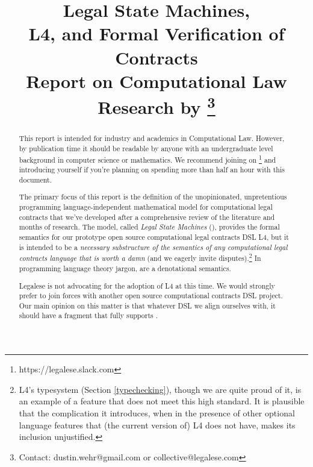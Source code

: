 \documentclass[12pt]{article}
\title{Legal State Machines, \\
L4, and Formal Verification of Contracts \\
\smaller \smaller Report on Computational Law Research by \extlink{https://legalese.com}{Legalese}\footnote{Contact: dustin.wehr@gmail.com or collective@legalese.com}\larger \larger }
\newcommand{\termz}[2]{\EM{\textsf{\hyperref[#1]{#2}}}\xspace}
\newcommand{\lsms}{\termz{LSM}{LSMs}}
\begin{document}
\maketitle

\begin{abstract}
This report is intended for industry and academics in Computational Law. However, by publication time it should be readable by anyone with an undergraduate level background in computer science or mathematics. We recommend joining  on \footnote{https://legalese.slack.com} and introducing yourself if you're planning on spending more than half an hour with this document. %

The primary focus of this report is the definition of the unopinionated, unpretentious programming language-independent mathematical model for computational legal contracts that we've developed after a comprehensive review of the literature and months of research. The model, called \textit{Legal State Machines} (\lsms), provides the formal semantics for our prototype open source computational legal contracts DSL L4, but it is intended to be a \textit{necessary substructure of the semantics of any computational legal contracts language that is worth a damn} (and we eagerly invite disputes).\footnote{L4's typesystem (Section \ref{typechecking}), though we are quite proud of it, is an example of a feature that does not meet this high standard. It is plausible that the complication it introduces, when in the presence of other optional language features that (the current version of) L4 does not have, makes its inclusion unjustified.}
In programming language theory jargon, \lsms are a denotational semantics.

Legalese is not advocating for the adoption of L4 at this time. We would strongly prefer to join forces with another open source computational contracts DSL project. Our main opinion on this matter is that whatever DSL we align ourselves with, it should have a fragment that fully supports \lsms.
\end{abstract}
\end{document}
